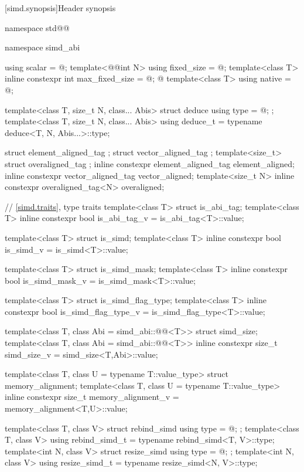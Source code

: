 [simd.synopsis]{Header \texorpdfstring{}{<simd>} synopsis}

\begin{codeblock}
namespace std@@ {
  namespace simd_abi {
    using scalar = @\seebelow@;
    template<@@int N> using fixed_size = @\seebelow@;
    template<class T> inline constexpr int max_fixed_size = @\impdef;%
    @
    template<class T> using native = @\impdef@;

    template<class T, size_t N, class... Abis> struct deduce { using type = @\seebelow@; };
    template<class T, size_t N, class... Abis> using deduce_t =
      typename deduce<T, N, Abis...>::type;
  }

  struct element_aligned_tag {};
  struct vector_aligned_tag {};
  template<size_t> struct overaligned_tag {};
  inline constexpr element_aligned_tag element_aligned{};
  inline constexpr vector_aligned_tag vector_aligned{};
  template<size_t N> inline constexpr overaligned_tag<N> overaligned{};

  // \ref{simd.traits},  type traits
  template<class T> struct is_abi_tag;
  template<class T> inline constexpr bool is_abi_tag_v = is_abi_tag<T>::value;

  template<class T> struct is_simd;
  template<class T> inline constexpr bool is_simd_v = is_simd<T>::value;

  template<class T> struct is_simd_mask;
  template<class T> inline constexpr bool is_simd_mask_v = is_simd_mask<T>::value;

  template<class T> struct is_simd_flag_type;
  template<class T> inline constexpr bool is_simd_flag_type_v =
    is_simd_flag_type<T>::value;

  template<class T, class Abi = simd_abi::@@<T>> struct simd_size;
  template<class T, class Abi = simd_abi::@@<T>>
    inline constexpr size_t simd_size_v = simd_size<T,Abi>::value;

  template<class T, class U = typename T::value_type> struct memory_alignment;
  template<class T, class U = typename T::value_type>
    inline constexpr size_t memory_alignment_v = memory_alignment<T,U>::value;

  template<class T, class V> struct rebind_simd { using type = @\seebelow@; };
  template<class T, class V> using rebind_simd_t = typename rebind_simd<T, V>::type;
  template<int N, class V> struct resize_simd { using type = @\seebelow@; };
  template<int N, class V> using resize_simd_t = typename resize_simd<N, V>::type;

}
\end{codeblock}
